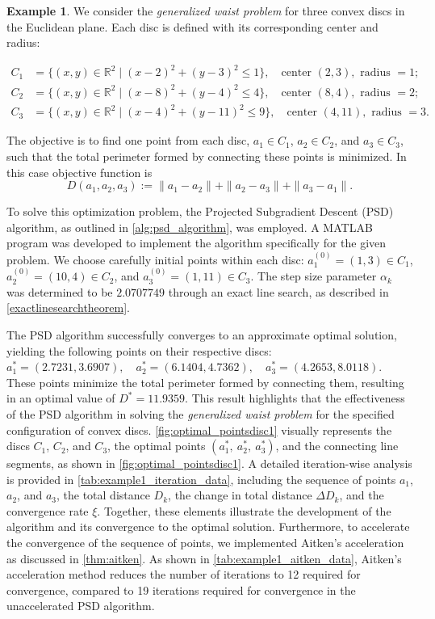 \documentclass[12pt]{article}
\theoremstyle{plain}
\theoremstyle{definition}
\newtheorem{example}[theorem]{Example}
\begin{document}
\begin{example}\label{disc_example}
	We consider the \emph{generalized waist problem} for three convex discs in the Euclidean plane. Each disc is defined with its corresponding center and radius:
	
	\[
	\begin{aligned}
		C_1 &= \{(x,y) \in \mathbb{R}^2 \mid (x-2)^2 + (y-3)^2 \leq 1\}, \quad \text{center } (2,3), \text{ radius } =1; \\
		C_2 &= \{(x,y) \in \mathbb{R}^2 \mid (x-8)^2 + (y-4)^2 \leq 4\}, \quad \text{center } (8,4), \text{ radius } =2; \\
		C_3 &= \{(x,y) \in \mathbb{R}^2 \mid (x-4)^2 + (y-11)^2 \leq 9\}, \quad \text{center } (4,11), \text{ radius } =3.
	\end{aligned}
	\]
	
	The objective is to find one point from each disc, \(a_1 \in C_1\), \(a_2 \in C_2\), and \(a_3 \in C_3\), such that the total perimeter formed by connecting these points is minimized. In this case objective function is 
	$$	D(a_1, a_2, a_3):= \|a_1 - a_2\| + \|a_2 - a_3\| + \|a_3 - a_1\|.$$
\end{example}
To solve this optimization problem, the Projected Subgradient Descent (PSD) algorithm, as outlined in \ref{alg:psd_algorithm}, was employed. A MATLAB program was developed to implement the algorithm specifically for the given problem. We choose carefully  initial points within each disc: \(a_1^{(0)} = (1,3) \in C_1\), \(a_2^{(0)} = (10,4) \in C_2\), and \(a_3^{(0)} = (1,11) \in C_3\). The step size parameter \(\alpha_k\) was determined to be \textbf{$2.0707749$} through an exact line search, as described in \ref{exactlinesearchtheorem}.

The PSD algorithm successfully converges to an approximate optimal solution, yielding the following points on their respective discs:
$a_1^* = (2.7231,3.6907), \quad a_2^* = (6.1404,4.7362), \quad a_3^* = (4.2653,8.0118).$ These points minimize the total perimeter formed by connecting them, resulting in an optimal value of \(D^* = 11.9359\). This result highlights that the effectiveness of the PSD algorithm in solving the \textit{generalized waist problem} for the specified configuration of convex discs. \ref{fig:optimal_pointsdisc1} visually represents the discs \(C_1\), \(C_2\), and \(C_3\), 
the optimal points \((a_1^*,\allowbreak\ a_2^*,\allowbreak\ a_3^*)\), and the connecting line segments, 
as shown in \ref{fig:optimal_pointsdisc1}.  A detailed iteration-wise analysis is provided in \ref{tab:example1_iteration_data}, 
including the sequence of points \(a_1\allowbreak\), \(a_2\allowbreak\), and \(a_3\allowbreak\), 
the total distance \(D_k\allowbreak\), the change in total distance \(\Delta D_k\allowbreak\), and the convergence rate \(\xi\).
Together, these elements illustrate the development of the algorithm and its convergence to the optimal solution. Furthermore, to accelerate the convergence of the sequence of points, we implemented Aitken's acceleration as discussed in \ref{thm:aitken}. As shown in \ref{tab:example1_aitken_data}, Aitken's acceleration method reduces the number of iterations to 12 required for convergence, compared to 19 iterations  required for convergence in the unaccelerated PSD algorithm.
\end{document}
